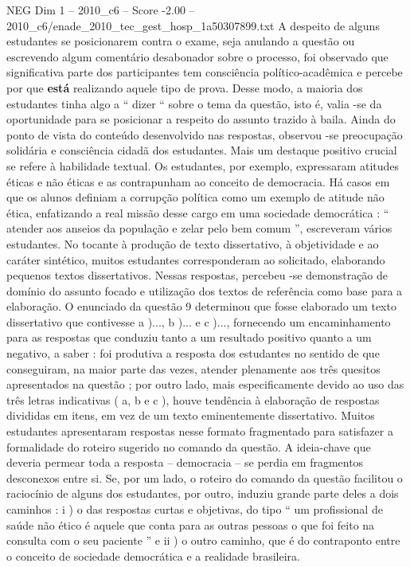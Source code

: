 \begin{textsample}{NEG Dim 1 – 2010\_c6 – Score -2.00 – 2010\_c6/enade\_2010\_tec\_gest\_hosp\_1a50307899.txt}
A despeito de alguns estudantes se posicionarem contra o exame, seja anulando a questão ou escrevendo algum comentário desabonador sobre o processo, foi observado que significativa parte dos participantes tem consciência político-acadêmica e percebe por que \textbf{está} realizando aquele tipo de prova.
Desse modo, a maioria dos estudantes tinha algo a “ dizer “ sobre o tema da questão, isto é, valia -se da oportunidade para se posicionar a respeito do assunto trazido à baila.
Ainda do ponto de vista do conteúdo desenvolvido nas respostas, observou -se preocupação solidária e consciência cidadã dos estudantes.
Mais um destaque positivo crucial se refere à habilidade textual.
Os estudantes, por exemplo, expressaram atitudes éticas e não éticas e as contrapunham ao conceito de democracia.
Há casos em que os alunos definiam a corrupção política como um exemplo de atitude não ética, enfatizando a real missão desse cargo em uma sociedade democrática : “ atender aos anseios da população e zelar pelo bem comum ”, escreveram vários estudantes.
No tocante à produção de texto dissertativo, à objetividade e ao caráter sintético, muitos estudantes corresponderam ao solicitado, elaborando pequenos textos dissertativos.
Nessas respostas, percebeu -se demonstração de domínio do assunto focado e utilização dos textos de referência como base para a elaboração.
O enunciado da questão 9 determinou que fosse elaborado um texto dissertativo que contivesse a )..., b )... e c )..., fornecendo um encaminhamento para as respostas que conduziu tanto a um resultado positivo quanto a um negativo, a saber : foi produtiva a resposta dos estudantes no sentido de que conseguiram, na maior parte das vezes, atender plenamente aos três quesitos apresentados na questão ; por outro lado, mais especificamente devido ao uso das três letras indicativas ( a, b e c ), houve tendência à elaboração de respostas divididas em itens, em vez de um texto eminentemente dissertativo.
Muitos estudantes apresentaram respostas nesse formato fragmentado para satisfazer a formalidade do roteiro sugerido no comando da questão.
A ideia-chave que deveria permear toda a resposta – democracia – se perdia em fragmentos desconexos entre si.
Se, por um lado, o roteiro do comando da questão facilitou o raciocínio de alguns dos estudantes, por outro, induziu grande parte deles a dois caminhos : i ) o das respostas curtas e objetivas, do tipo “ um profissional de saúde não ético é aquele que conta para as outras pessoas o que foi feito na consulta com o seu paciente ” e ii ) o outro caminho, que é do contraponto entre o conceito de sociedade democrática e a realidade brasileira.

\end{textsample}
